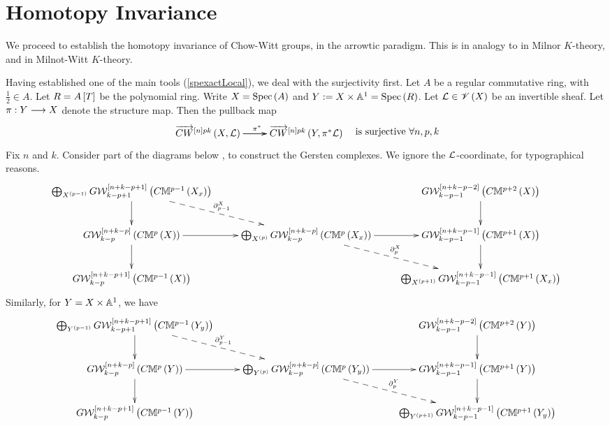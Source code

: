 \documentclass[12pt]{article}
\begin{document}
\section{\bf Homotopy Invariance} \label{SecHomo}%

We proceed to establish the
 homotopy invariance of Chow-Witt groups, in the arrowtic paradigm. This is in analogy to 
 \cite[pp 370]{R96} in  Milnor $K$-theory, and \cite[pp 105]{F8} in Milnot-Witt $K$-theory. 
 
 Having established one of the main tools (\ref{spexactLocal}), we deal with the surjectivity first.
\bP%
\label{Thm1124Sudh}{\rm 
Let $A$ be a regular commutative ring, with $\frac{1}{2}\in A$.  Let $R=A\left[ T\right]$ be the polynomial ring. Write $X=\mathrm{Spec}\left(A\right)$ and 
$Y:=X\times {\mathbb{A}}^1=\mathrm{Spec}\left(R\right)$. Let ${\mathcal{L}}\in {\mathscr {V}}\left( X\right)$ be an invertible sheaf. 
Let $\pi: Y \longrightarrow X$ denote the structure map. Then the pullback map
$$
\diagram 
\ora{CW}^{\LRt{n}pk} \LRf{X, {\CL}} \ar[r]^{\pi^*} \ar[r]& \ora{CW}^{\LRt{n}pk}\LRf{Y, \pi^*{\CL}} \\
\enddiagram 
\quad {\rm is ~surjective}~\forall n, p, k
$$
}
\eP
\pf  Fix $n$ and $k$.  Consider part of the diagrams below \cite[pp 473]{M23}, to construct the 
Gersten complexes. We  ignore the ${\mathcal{L}}$-coordinate, for typographical reasons.
{
\begin{equation}\label{473GerXuu}
\diagram 
\bigoplus_{X^{\LRf{p-1}}}G{\CW}_{k-p+1}^{\LRt{n+k-p+1}}\LRf{C{\BM}^{p-1}\LRf{X_x}}\ar[d] 
\ar@{-->}[dr]^{\partial_{p-1}^X}&& G{\CW}_{k-p-1}^{\LRt{n+k-p-2}}\LRf{C{\BM}^{p+2}\LRf{X}}\ar[d]\\
%
 G{\CW}_{k-p}^{\LRt{n+k-p}}\LRf{C{\BM}^{p}\LRf{X}} \ar[r]\ar[d]&
 \bigoplus_{X^{\LRf{p}}}G{\CW}_{k-p}^{\LRt{n+k-p}}\LRf{C{\BM}^{p}\LRf{X_x}} \ar[r]\ar@{-->}[dr]^{\partial_{p}^X}
 &G{\CW}_{k-p-1}^{\LRt{n+k-p-1}}\LRf{C{\BM}^{p+1}\LRf{X}}\ar[d] \\
 G{\CW}_{k-p}^{\LRt{n+k-p+1}}\LRf{C{\BM}^{p-1}\LRf{X}}  &&  
 \bigoplus_{X^{\LRf{p+1}}}G{\CW}_{k-p-1}^{\LRt{n+k-p-1}}\LRf{C{\BM}^{p+1}\LRf{X_x}}\\
\enddiagram 
\end{equation}
}
Similarly, for $Y=X\times {\mathbb{A}}^1$, we have
{
\begin{equation}\label{YMaroGerXuu}
\diagram 
\bigoplus_{Y^{\LRf{p-1}}}G{\CW}_{k-p+1}^{\LRt{n+k-p+1}}\LRf{C{\BM}^{p-1}\LRf{Y_y}}\ar[d] 
\ar@{-->}[dr]^{\partial_{p-1}^Y}&& G{\CW}_{k-p-1}^{\LRt{n+k-p-2}}\LRf{C{\BM}^{p+2}\LRf{Y}}\ar[d]\\
%
 G{\CW}_{k-p}^{\LRt{n+k-p}}\LRf{C{\BM}^{p}\LRf{Y}} \ar[r]\ar[d]&
 \bigoplus_{Y^{\LRf{p}}}G{\CW}_{k-p}^{\LRt{n+k-p}}\LRf{C{\BM}^{p}\LRf{Y_y}} \ar[r]\ar@{-->}[dr]^{\partial_{p}^Y}
 &G{\CW}_{k-p-1}^{\LRt{n+k-p-1}}\LRf{C{\BM}^{p+1}\LRf{Y}}\ar[d] \\
 G{\CW}_{k-p}^{\LRt{n+k-p+1}}\LRf{C{\BM}^{p-1}\LRf{Y}}  &&  
 \bigoplus_{Y^{\LRf{p+1}}}G{\CW}_{k-p-1}^{\LRt{n+k-p-1}}\LRf{C{\BM}^{p+1}\LRf{Y_y}}\\
\enddiagram 
\end{equation}
}
\end{document}
